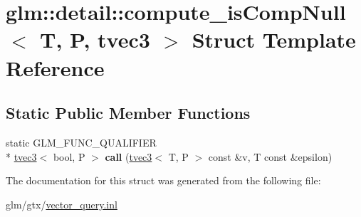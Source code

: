 \hypertarget{structglm_1_1detail_1_1compute__isCompNull_3_01T_00_01P_00_01tvec3_01_4}{\section{glm\-:\-:detail\-:\-:compute\-\_\-is\-Comp\-Null$<$ T, P, tvec3 $>$ Struct Template Reference}
\label{structglm_1_1detail_1_1compute__isCompNull_3_01T_00_01P_00_01tvec3_01_4}
}
\subsection*{Static Public Member Functions}
\begin{DoxyCompactItemize}
\item 
\hypertarget{structglm_1_1detail_1_1compute__isCompNull_3_01T_00_01P_00_01tvec3_01_4_aeed450148ffffe117e96c998a31a78e6}{static G\-L\-M\-\_\-\-F\-U\-N\-C\-\_\-\-Q\-U\-A\-L\-I\-F\-I\-E\-R \\*
\hyperlink{structglm_1_1tvec3}{tvec3}$<$ bool, P $>$ {\bfseries call} (\hyperlink{structglm_1_1tvec3}{tvec3}$<$ T, P $>$ const \&v, T const \&epsilon)}\label{structglm_1_1detail_1_1compute__isCompNull_3_01T_00_01P_00_01tvec3_01_4_aeed450148ffffe117e96c998a31a78e6}

\end{DoxyCompactItemize}


The documentation for this struct was generated from the following file\-:\begin{DoxyCompactItemize}
\item 
glm/gtx/\hyperlink{vector__query_8inl}{vector\-\_\-query.\-inl}\end{DoxyCompactItemize}

